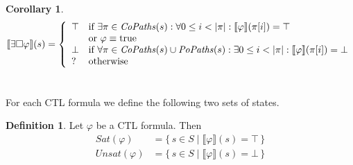 \documentclass[12pt]{article}
\newcommand{\always}{\Box}
\newcommand{\TRUE}{\mbox{\lstinline{true}}}
\newtheorem{corollary}{Corollary}
\theoremstyle{definition}
\newtheorem{definition}{Definition}
\newcommand{\satisfaction}[1]{\llbracket #1 \rrbracket}
\newcommand{\bottom}{\mathord{\perp}}
\newenvironment{franck}{\color{red}}{\color{black}}
\begin{document}
\begin{franck}
\begin{corollary}
\[
\satisfaction{\exists \always \varphi}(s) = \left \{
\begin{array}{ll}
\top & \mbox{if $\exists \pi \in \mathit{CoPaths}(s) : \forall 0 \leq i < |\pi| : \satisfaction{\varphi}(\pi[i]) = \top$}\\
& \mbox{or $\varphi \equiv \TRUE$}\\
\bottom & \mbox{if $\forall \pi \in \mathit{CoPaths}(s) \cup \mathit{PoPaths}(s) : \exists 0 \leq i < |\pi| : \satisfaction{\varphi}(\pi[i]) = \bottom$}\\
? & \mbox{otherwise}
\end{array}
\right .
\]
\end{corollary}
\end{franck}

\section{}

For each CTL formula we define the following two sets of states.

\begin{definition}
Let $\varphi$ be a CTL formula.  Then
\begin{align*}
\mathit{Sat}(\varphi) & = \{\, s \in S \mid \satisfaction{\varphi}(s) = \top \,\}\\
\mathit{Unsat}(\varphi) & = \{\, s \in S \mid \satisfaction{\varphi}(s) = \bottom \,\}
\end{align*}
\end{definition}
\end{document}
